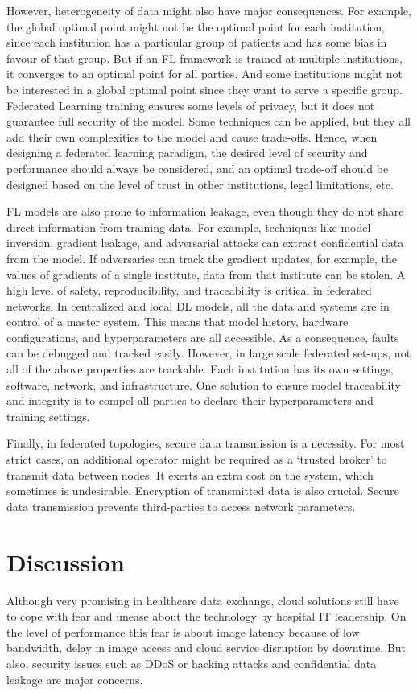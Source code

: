 However, heterogeneity of data might also have major consequences. For example, the global optimal point might not be the optimal point for each institution, since each institution has a particular group of patients and has some bias in favour of that group. But if an FL framework is trained at multiple institutions, it converges to an optimal point for all parties. And some institutions might not be interested in a global optimal point since they want to serve a specific group. 
Federated Learning training ensures some levels of privacy, but it does not guarantee full security of the model. Some techniques can be applied, but they all add their own complexities to the model and cause trade-offs. Hence, when designing a federated learning paradigm, the desired level of security and performance should always be considered, and an optimal trade-off should be designed based on the level of trust in other institutions, legal limitations, etc. 


FL models are also prone to information leakage, even though they do not share direct information from training data. For example, techniques like model inversion, gradient leakage, and adversarial attacks can extract confidential data from the model. If adversaries can track the gradient updates, for example, the values of gradients of a single institute, data from that institute can be stolen.
A high level of safety, reproducibility, and traceability is critical in federated networks. In centralized and local DL models, all the data and systems are in control of a master system. This means that model history, hardware configurations, and hyperparameters are all accessible. As a consequence, faults can be debugged and tracked easily. However, in large scale federated set-ups, not all of the above properties are trackable. Each institution has its own settings, software, network, and infrastructure. One solution to ensure model traceability and integrity is to compel all parties to declare their hyperparameters and training settings.


Finally, in federated topologies, secure data transmission is a necessity. For most strict cases, an additional operator might be required as a ‘trusted broker’ to transmit data between nodes. It exerts an extra cost on the system, which sometimes is undesirable. Encryption of transmitted data is also crucial. Secure data transmission prevents third-parties to access network parameters.
\section{Discussion}
Although very promising in healthcare data exchange, cloud solutions still have to cope with fear and unease about the technology by hospital IT leadership.  On the level of performance this fear is about image latency because of low bandwidth, delay in image access and cloud service disruption by downtime. But also, security issues such as DDoS or hacking attacks and confidential data leakage are major concerns.


